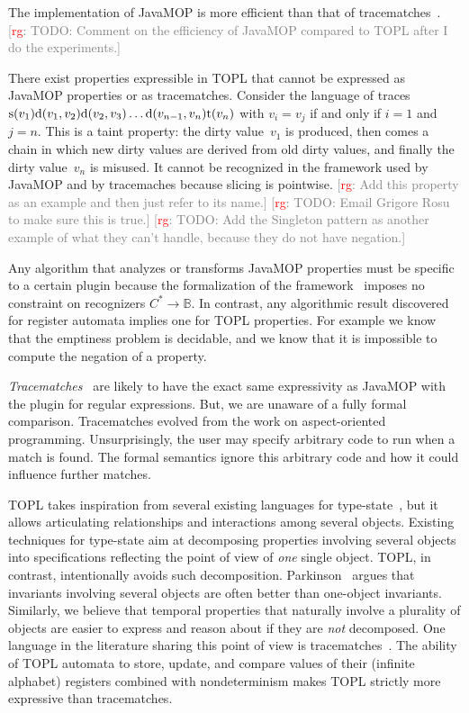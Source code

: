\documentclass[9pt, preprint]{sigplanconf} %
\newcommand{\noterg}[2]{\textcolor{gray}{[\textcolor{red}{#1}: #2]}}
\newcommand{\rg}[1]{\noterg{rg}{#1}}
\newcommand{\B}{\ensuremath{\mathbb{B}}}
\theoremstyle{definition}
\theoremstyle{remark}
\begin{document}
The implementation of JavaMOP is more efficient than that of tracematches~\cite{dblp:journals/corr/abs-1112-5761}.
\rg{TODO: Comment on the efficiency of JavaMOP compared to TOPL after I do the experiments.}

There exist properties expressible in TOPL that cannot be expressed as JavaMOP properties or as tracematches.
Consider the language of traces
${\rm s}(v_1) {\rm d}(v_1,v_2){\rm d}(v_2,v_3)\ldots{\rm d}(v_{n-1},v_n){\rm t}(v_n)$
with $v_i=v_j$ if and only if $i=1$ and $j=n$.
This is a taint property: the dirty value~$v_1$ is produced, then comes a chain in which new dirty values are derived from old dirty values, and finally the dirty value~$v_n$ is misused.
It cannot be recognized in the framework used by JavaMOP and by tracemaches because slicing is pointwise.
\rg{Add this property as an example and then just refer to its name.}
\rg{TODO: Email Grigore Rosu to make sure this is true.}
\rg{TODO: Add the Singleton pattern as another example of what they can't handle, because they do not have negation.}

Any algorithm that analyzes or transforms JavaMOP properties must be specific to a certain plugin because the formalization of the framework~\cite{dblp:journals/corr/abs-1112-5761} imposes no constraint on recognizers $C^*\to\B$.
In contrast, any algorithmic result discovered for register automata implies one for TOPL properties.
For example we know that the emptiness problem is decidable, and we know that it is impossible to compute the negation of a property.

{\it Tracematches\/}~\cite{dblp:conf/oopsla/allanachklmsst05} are likely to have the exact same expressivity as JavaMOP with the plugin for regular expressions.
But, we are unaware of a fully formal comparison.
Tracematches evolved from the work on aspect-oriented programming.
Unsurprisingly, the user may specify arbitrary code to run when a match is found.
The formal semantics ignore this arbitrary code and how it could influence further matches.


TOPL takes inspiration from several existing  languages for type-state~\cite{strom1986,dblp:conf/oopsla/bierhoffa07,dblp:conf/oopsla/naeeml08,disney2011,ball2002}, but  it allows articulating  relationships and interactions among several objects.
Existing techniques for type-state aim at decomposing properties involving several objects into specifications reflecting the point of view of {\em one} single object.
TOPL, in contrast,  intentionally avoids such decomposition.
Parkinson~\cite{parkinson-iwaco2007} argues that invariants involving several objects are often better than one-object invariants.
Similarly, we believe that temporal properties that naturally involve a plurality of objects are easier to express and reason about if they are \emph{not} decomposed.
One language in the literature sharing this point of view is tracematches~\cite{dblp:conf/oopsla/allanachklmsst05}.
The ability of TOPL automata to store,  update, and compare values of their (infinite alphabet) registers combined with nondeterminism makes TOPL strictly more expressive than tracematches.
\end{document}
